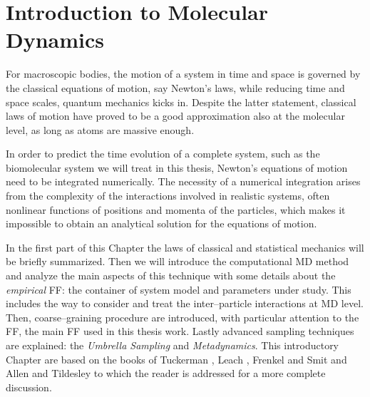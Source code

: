 \chapter{Introduction to Molecular Dynamics}
For macroscopic bodies, the motion of a system in time and space is governed by the classical equations of
motion, say Newton’s laws, while reducing time and space scales, quantum mechanics kicks in. Despite the latter
statement, classical laws of motion have proved to be a good approximation also at the molecular level, as long
as atoms are massive enough.

In order to predict the time evolution of a complete system, such as the biomolecular system we will treat in
this thesis, Newton’s equations of motion need to be integrated numerically. The necessity of a numerical
integration arises from the complexity of the interactions involved in realistic systems, often nonlinear
functions of positions and momenta of the particles, which makes it impossible to obtain an analytical solution
for the equations of motion.

In the first part of this Chapter the laws of classical and statistical mechanics will be briefly summarized.
Then we will introduce the computational \acf{MD} method and analyze the main aspects of this technique with some
details about the \textit{empirical} \ac{FF}: the container of system model and parameters under study. This
includes the way to consider and treat the inter--particle interactions at \ac{MD} level. Then, coarse--graining
procedure are introduced, with particular attention to the \martini \ac{FF}, the main \ac{FF} used in this thesis
work. Lastly advanced sampling techniques are explained: the \textit{Umbrella Sampling} and
\textit{Metadynamics}. This introductory Chapter are based on the books of Tuckerman \cite{Tuckerman}, Leach
\cite{Leach}, Frenkel and Smit \cite{Frenkel} and Allen and Tildesley \cite{Allen} to which the reader is
addressed for a more complete discussion.

